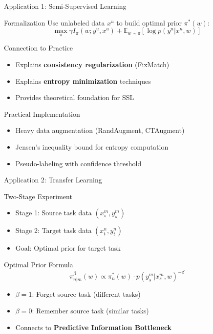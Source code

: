 \documentclass{beamer}
\begin{document}
\begin{frame}{Application 1: Semi-Supervised Learning}

\begin{block}{Formalization}
Use unlabeled data $x^u$ to build optimal prior $\pi^*(w)$:
\[
\max_{\pi} \gamma I_{\pi}(w; y^u, x^u) + \mathbb{E}_{w \sim \pi} [\log p(y^n | x^n, w)]
\]
\end{block}

\begin{block}{Connection to Practice}
\begin{itemize}
\item Explains \textbf{consistency regularization} (FixMatch)
\item Explains \textbf{entropy minimization} techniques
\item Provides theoretical foundation for SSL
\end{itemize}
\end{block}

\begin{block}{Practical Implementation}
\begin{itemize}
\item Heavy data augmentation (RandAugment, CTAugment)
\item Jensen's inequality bound for entropy computation
\item Pseudo-labeling with confidence threshold
\end{itemize}
\end{block}

\end{frame}

\begin{frame}{Application 2: Transfer Learning}

\begin{block}{Two-Stage Experiment}
\begin{itemize}
\item Stage 1: Source task data $(x_s^m, y_s^m)$
\item Stage 2: Target task data $(x_t^n, y_t^n)$
\item Goal: Optimal prior for target task
\end{itemize}
\end{block}

\begin{block}{Optimal Prior Formula}
\[
\pi_{n|m}^\beta(w) \propto \pi_n^*(w) \cdot p(y_s^m | x_s^m, w)^{-\beta}
\]
\begin{itemize}
\item $\beta = 1$: Forget source task (different tasks)
\item $\beta = 0$: Remember source task (similar tasks)
\item Connects to \textbf{Predictive Information Bottleneck}
\end{itemize}
\end{block}

\end{frame}
\end{document}
